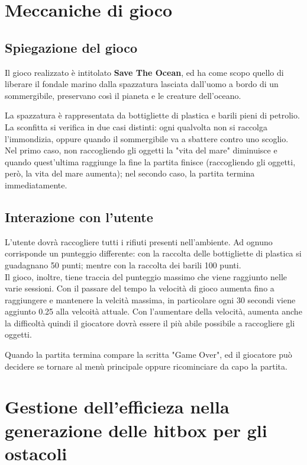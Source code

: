 \documentclass[12pt]{article}
\begin{document}
\section{Meccaniche di gioco}
\subsection{Spiegazione del gioco}
Il gioco realizzato è intitolato \textbf{Save The Ocean}, ed ha come scopo quello di liberare il fondale marino dalla spazzatura lasciata dall'uomo a bordo di un sommergibile, preservano così il pianeta e le creature dell'oceano.

La spazzatura è rappresentata da bottigliette di plastica e barili pieni di petrolio.
\\

La sconfitta si verifica in due casi distinti: ogni qualvolta non si raccolga l'immondizia, oppure quando il sommergibile va a sbattere contro uno scoglio. Nel primo caso, non raccogliendo gli oggetti la "vita del mare" diminuisce e quando quest'ultima raggiunge la fine la partita finisce (raccogliendo gli oggetti, però, la vita del mare aumenta); nel secondo caso, la partita termina immediatamente. 
 

\subsection{Interazione con l'utente}
 
L'utente dovrà raccogliere tutti i rifiuti presenti nell'ambiente. Ad ognuno corrisponde un punteggio differente: con la raccolta delle bottigliette di plastica si guadagnano 50 punti; mentre con la raccolta dei barili 100 punti. 
\\Il gioco, inoltre, tiene traccia del punteggio massimo che viene raggiunto nelle varie sessioni.
Con il passare del tempo la velocità di gioco aumenta fino a raggiungere e mantenere la velcità massima, in particolare ogni 30 secondi viene aggiunto 0.25 alla velcoità attuale. Con l'aumentare della velocità, aumenta anche la difficoltà quindi il giocatore dovrà essere il più abile possibile a raccogliere gli oggetti. 


Quando la partita termina compare la scritta "Game Over", ed il giocatore può decidere se tornare al menù principale oppure ricominciare da capo la partita. 

\section{Gestione dell’efficieza nella generazione delle hitbox
per gli ostacoli}
\end{document}
